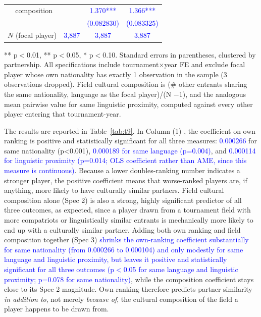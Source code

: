 \documentclass[10pt]{article}
\begin{document}
\begin{table}[htbp]
\begin{threeparttable}
\begin{tabular}{llccc}
 & composition & & \textcolor{blue}{1.370***} & \textcolor{blue}{1.366***} \\
 & & & \textcolor{blue}{(0.082830)} & \textcolor{blue}{(0.083325)} \\
\midrule
\multicolumn{2}{l}{$N$ (focal player)} & \textcolor{blue}{3,887} & \textcolor{blue}{3,887} & \textcolor{blue}{3,887} \\
\bottomrule
\end{tabular}
\begin{tablenotes}
\small
\item *** p$<$0.01, ** p$<$0.05, * p$<$0.10. Standard errors in parentheses, clustered by partnership. All specifications include tournament$\times$year FE and exclude focal player whose own nationality has exactly 1 observation in the sample (3 observations dropped). Field cultural composition is (\# other entrants sharing the same nationality, language as the focal player)/(N $-1$), and the analogous mean pairwise value for same linguistic proximity, computed against every other player entering that tournament-year.
\end{tablenotes}
\end{threeparttable}
\end{table}
\FloatBarrier


The results are reported in Table~\ref{tab:t9}. In Column (1) , the coefficient on own ranking is positive and statistically significant for all three measures: \textcolor{blue}{0.000266} for same nationality (p<0.001), \textcolor{blue}{0.000189 for same language (p=0.004)}, and \textcolor{blue}{0.000114 for linguistic proximity (p=0.014; OLS coefficient rather than AME, since this measure is continuous)}. Because a lower doubles-ranking number indicates a stronger player, the positive coefficient means that worse-ranked players are, if anything, more likely to have culturally similar partners.
Field cultural composition alone (Spec 2) is also a strong, highly significant predictor of all three outcomes, as expected, since a player drawn from a tournament field with more compatriots or linguistically similar entrants is mechanically more likely to end up with a culturally similar partner. Adding both own ranking and field composition together (Spec 3) \textcolor{blue}{shrinks the own-ranking coefficient substantially for same nationality (from 0.000266 to 0.000104) and only modestly for same language and linguistic proximity, but leaves it positive and statistically significant for all three outcomes (p$<$0.05 for same language and linguistic proximity; p=0.078 for same nationality)}, while the composition coefficient stays close to its Spec 2 magnitude. Own ranking therefore predicts partner similarity \emph{in addition to}, not merely \emph{because of}, the cultural composition of the field a player happens to be drawn from.
\end{document}
